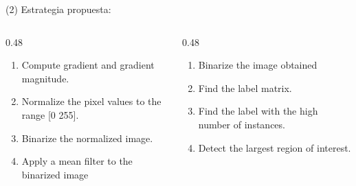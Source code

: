\begin{frame}{\citetitle{\EntradaBibtex} (2)}
Estrategia propuesta:
\begin{columns}
		\begin{column}{0.48\textwidth}

		    \begin{enumerate} \small
		        \item Compute gradient and gradient magnitude.
                \item Normalize the pixel values to the range [0 255].
                \item Binarize the normalized image.
                \item Apply a mean filter to the binarized image            
            \end{enumerate}  
        \end{column}          
		\begin{column}{0.48\textwidth}
		    \begin{enumerate} \small
				\setcounter{enumi}{4}
    \item Binarize the image obtained
                \item Find the label matrix.
                \item Find the label with the high number of instances.
                \item Detect the largest region of interest.			
            \end{enumerate}  

        \end{column}
\end{columns}








\end{frame}

